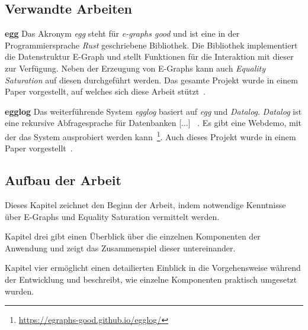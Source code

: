 \subsection{Verwandte Arbeiten}\label{sub:verwandtearbeiten}

\noindent\textbf{egg} Das Akronym \textit{egg} steht für \textit{e-graphs good} und ist eine in der Programmiersprache \textit{Rust} geschriebene Bibliothek.
Die Bibliothek implementiert die Datenstruktur E-Graph und stellt Funktionen für die Interaktion mit dieser zur Verfügung.
Neben der Erzeugung von E-Graphs kann auch \textit{Equality Saturation} auf diesen durchgeführt werden.
Das gesamte Projekt wurde in einem Paper vorgestellt, auf welches sich diese Arbeit stützt~\cite{2021-egg}.

\noindent\textbf{egglog} Das weiterführende System \textit{egglog} basiert auf \textit{egg} und \textit{Datalog}. 
\textit{Datalog} ist eine \glqq [...] rekursive Abfragesprache für Datenbanken [...] \grqq~\cite{2023-egglog}.
Es gibt eine Webdemo, mit der das System ausprobiert werden kann~\footnote{\url{https://egraphs-good.github.io/egglog/}}.
Auch dieses Projekt wurde in einem Paper vorgestellt~\cite{2023-egglog}.


\subsection{Aufbau der Arbeit}

\vspace{-2mm}

Dieses Kapitel zeichnet den Beginn der Arbeit, indem notwendige Kenntnisse über E-Graphs und Equality Saturation vermittelt werden.
\vspace{6mm}

\vspace{-2mm}

Kapitel drei gibt einen Überblick über die einzelnen Komponenten der Anwendung und zeigt das Zusammenspiel dieser untereinander.
\vspace{6mm}

\vspace{-2mm}

Kapitel vier ermöglicht einen detailierten Einblick in die Vorgehensweise während der Entwicklung und beschreibt, wie einzelne Komponenten praktisch umgesetzt wurden.
\vspace{6mm}

